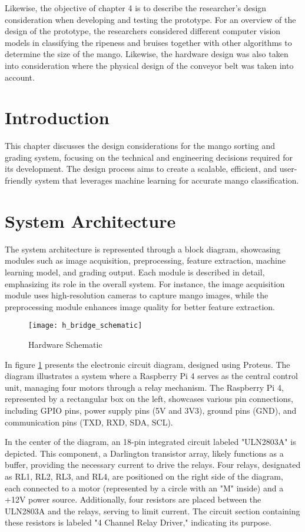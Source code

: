 
Likewise, the objective of chapter 4 is to describe the researcher's design 
consideration when developing and testing the prototype. For an overview of 
the design of the prototype, the researchers considered different computer vision models in
 classifying the ripeness and bruises together with other algorithms to determine 
 the size of the mango. Likewise, the hardware design was also taken into consideration where 
 the physical design of the conveyor belt was taken into account.

\section{Introduction}
This chapter discusses the design considerations for the mango 
sorting and grading system, focusing on the technical and engineering decisions 
required for its development. The design process aims to create a scalable, efficient, 
and user-friendly system that leverages machine learning for accurate mango classification.

\section{System Architecture}
The system architecture is represented through a block diagram, showcasing modules such as image acquisition, 
preprocessing, feature extraction, machine learning model, and grading output. Each module is described in detail, 
emphasizing its role in the overall system. For instance, the image acquisition module uses high-resolution cameras 
to capture mango images, while the preprocessing module enhances image quality for better feature extraction.

\begin{figure}[!htbp]
	\centering
	\texttt{[image: h\_bridge\_schematic]}
	\caption{Hardware Schematic}
	\label{fig:h_bridge_fig}
\end{figure}

In figure \ref{fig:h_bridge_fig} presents the electronic circuit diagram,
designed using Proteus. The diagram illustrates a system where a Raspberry Pi 4
serves as the central control unit, managing four motors through a relay
mechanism. The Raspberry Pi 4, represented by a rectangular box on the left,
showcases various pin connections, including GPIO pins, power supply pins (5V
and 3V3), ground pins (GND), and communication pins (TXD, RXD, SDA, SCL).

In the center of the diagram, an 18-pin integrated circuit labeled "ULN2803A" is
depicted. This component, a Darlington transistor array, likely functions as a
buffer, providing the necessary current to drive the relays. Four relays,
designated as RL1, RL2, RL3, and RL4, are positioned on the right side of the
diagram, each connected to a motor (represented by a circle with an "M" inside)
and a +12V power source. Additionally, four resistors are placed between the
ULN2803A and the relays, serving to limit current. The circuit section
containing these resistors is labeled "4 Channel Relay Driver," indicating its
purpose.

